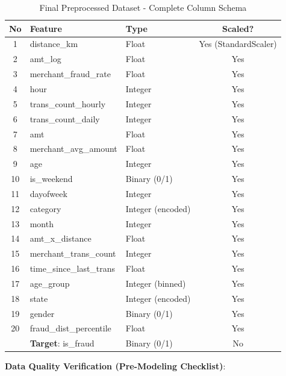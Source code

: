 \begin{table}[H]
\centering
\caption{Final Preprocessed Dataset - Complete Column Schema}
\footnotesize
\begin{tabular}{|c|l|l|c|}
\hline
\textbf{No} & \textbf{Feature} & \textbf{Type} & \textbf{Scaled?} \\
\hline
1 & distance\_km & Float & Yes (StandardScaler) \\
\hline
2 & amt\_log & Float & Yes \\
\hline
3 & merchant\_fraud\_rate & Float & Yes \\
\hline
4 & hour & Integer & Yes \\
\hline
5 & trans\_count\_hourly & Integer & Yes \\
\hline
6 & trans\_count\_daily & Integer & Yes \\
\hline
7 & amt & Float & Yes \\
\hline
8 & merchant\_avg\_amount & Float & Yes \\
\hline
9 & age & Integer & Yes \\
\hline
10 & is\_weekend & Binary (0/1) & Yes \\
\hline
11 & dayofweek & Integer & Yes \\
\hline
12 & category & Integer (encoded) & Yes \\
\hline
13 & month & Integer & Yes \\
\hline
14 & amt\_x\_distance & Float & Yes \\
\hline
15 & merchant\_trans\_count & Integer & Yes \\
\hline
16 & time\_since\_last\_trans & Float & Yes \\
\hline
17 & age\_group & Integer (binned) & Yes \\
\hline
18 & state & Integer (encoded) & Yes \\
\hline
19 & gender & Binary (0/1) & Yes \\
\hline
20 & fraud\_dist\_percentile & Float & Yes \\
\hline
\hline
& \textbf{Target}: is\_fraud & Binary (0/1) & No \\
\hline
\end{tabular}
\end{table}

\textbf{Data Quality Verification (Pre-Modeling Checklist)}:


